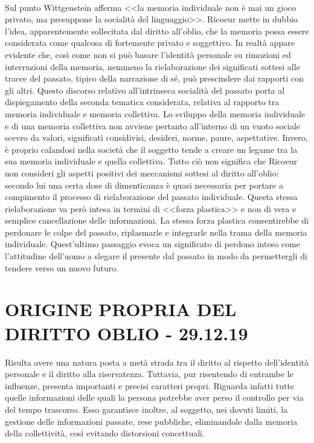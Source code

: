 \\Sul punto Wittgenstein afferma <<la memoria individuale non è mai un gioco privato, ma presuppone la socialità del linguaggio>>. Ricoeur mette in dubbio l'idea, apparentemente sollecitata dal diritto all'oblio, che la memoria possa essere considerata come qualcosa di fortemente privato e soggettivo. In realtà appare evidente che, così come non si può basare l'identità personale su rimozioni ed interruzioni della memoria, nemmeno la rielaborazione dei significati sottesi alle tracce del passato, tipico della narrazione di sé, può prescindere dai rapporti con gli altri.
Questo discorso relativo all'intrinseca socialità del passato porta al dispiegamento della seconda tematica considerata, relativa al rapporto tra memoria individuale e memoria collettiva.
Lo sviluppo della memoria individuale e di una memoria collettiva non avviene pertanto all'interno di un vuoto sociale scevro da valori, significati considivisi, desideri, norme, paure, aspettative. Invero, è proprio calandosi nella società che il soggetto tende a creare un legame tra la sua memoria individuale e quella collettiva. Tutto ciò non significa che Ricoeur non consideri gli aspetti positivi dei meccanismi sottesi al diritto all'oblio: secondo lui una certa dose di dimenticanza è quasi necessaria per portare  a compimento il processo di rielaborazione del passato individuale. Questa stessa rielaborazione va però intesa in termini di <<forza plastica>> e non di vera e semplice cancellazione delle informazioni. La stessa forza plastica consentirebbe di perdonare le colpe del passato, riplasmarle e integrarle nella trama della memoria individuale. Quest'ultimo passaggio evoca un significato di perdono inteso come l'attitudine dell'uomo a slegare il presente dal passato in modo da permettergli di tendere verso un nuovo futuro.
\section{ORIGINE PROPRIA DEL DIRITTO OBLIO - 29.12.19}
Risulta avere una natura posta a metà strada tra il diritto al rispetto dell'identità personale e il diritto alla riservatezza. Tuttavia, pur risentendo di entrambe le influenze, presenta importanti e precisi caratteri propri.
Riguarda infatti tutte quelle informazioni delle quali la persona potrebbe aver perso il controllo per via del tempo trascorso. Esso garantisce inoltre, al soggetto, nei dovuti limiti, la gestione delle informazioni passate, rese pubbliche, eliminandole dalla memoria della collettività, così evitando distorsioni concettuali.
